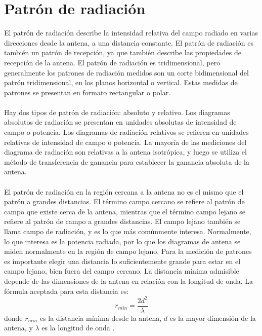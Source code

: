 \documentclass[12pt,letterpaper]{article}
\begin{document}
\section{Patrón de radiación}
El patrón de radiación describe la intensidad relativa del campo radiado en varias 
direcciones desde la antena, a una distancia constante. El patrón de radiación es también 
un patrón de recepción, ya que también describe las propiedades de recepción de la antena. 
El patrón de radiación es tridimensional, pero generalmente los patrones de radiación 
medidos son un corte bidimensional del patrón tridimensional, en los planos horizontal o 
vertical. Estas medidas de patrones se presentan en formato rectangular o polar. 
\\ \\
Hay dos tipos de patrón de radiación: absoluto y relativo. Los diagramas absolutos de 
radiación se presentan en unidades absolutas de intensidad de campo o potencia. Los 
diagramas de radiación relativos se refieren en unidades relativas de intensidad de 
campo o potencia. La mayoría de las mediciones del diagrama de radiación son relativas a 
la antena isotrópica, y luego se utiliza el método de transferencia de ganancia para 
establecer la ganancia absoluta de la antena.
\\ \\ 
El patrón de radiación en la región cercana a la antena no es el mismo que el patrón 
a grandes distancias. El término campo cercano se refiere al patrón de campo que existe 
cerca de la antena, mientras que el término campo lejano se refiere al patrón de campo 
a grandes distancias. El campo lejano también se llama campo de radiación, y es lo que 
más comúnmente interesa. Normalmente, lo que interesa es la potencia radiada, por lo que 
los diagramas de antena se miden normalmente en la región de campo lejano. Para la 
medición de patrones es importante elegir una distancia lo suficientemente grande para 
estar en el campo lejano, bien fuera del campo cercano. La distancia mínima admisible 
depende de las dimensiones de la antena en relación con la longitud de onda. La fórmula 
aceptada para esta distancia es:
\begin{equation}
    r_{min}=\frac{2d^2}{\lambda}
\end{equation}
donde $r_{min}$ es la distancia mínima desde la antena, $d$ es la mayor dimensión de la 
antena, y $\lambda$ es la longitud de onda \cite{radiacion}. 
\end{document}
